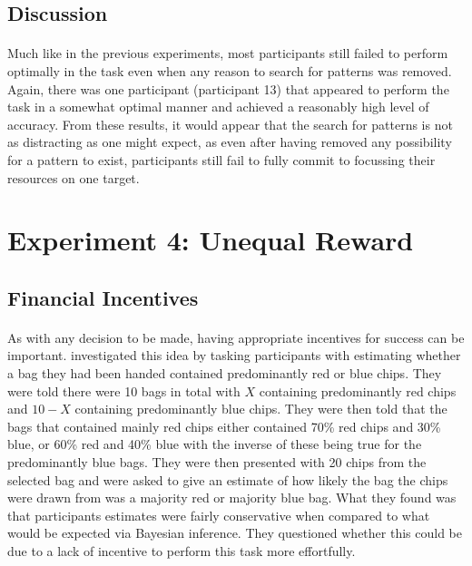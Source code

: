 \documentclass[12pt]{article}
\begin{document}
\subsection*{Discussion}
\paragraph{} Much like in the previous experiments, most participants still failed to perform optimally in the task even when any reason to search for patterns was removed. Again, there was one participant (participant 13) that appeared to perform the task in a somewhat optimal manner and achieved a reasonably high level of accuracy. From these results, it would appear that the search for patterns is not as distracting as one might expect, as even after having removed any possibility for a pattern to exist, participants still fail to fully commit to focussing their resources on one target.


\section*{Experiment 4: Unequal Reward}

\subsection*{Financial Incentives}

\paragraph{} As with any decision to be made, having appropriate incentives for success can be important. \cite{phillips1966conservatism} investigated this idea by tasking participants with estimating whether a bag they had been handed contained predominantly red or blue chips. They were told there were 10 bags in total with $X$ containing predominantly red chips and $10 - X$ containing predominantly blue chips. They were then told that the bags that contained mainly red chips either contained 70\% red chips and 30\% blue, or 60\% red and 40\% blue with the inverse of these being true for the predominantly blue bags. They were then presented with 20 chips from the selected bag and were asked to give an estimate of how likely the bag the chips were drawn from was a majority red or majority blue bag. What they found was that participants estimates were fairly conservative when compared to what would be expected via Bayesian inference. They questioned whether this could be due to a lack of incentive to perform this task more effortfully. 
\end{document}
